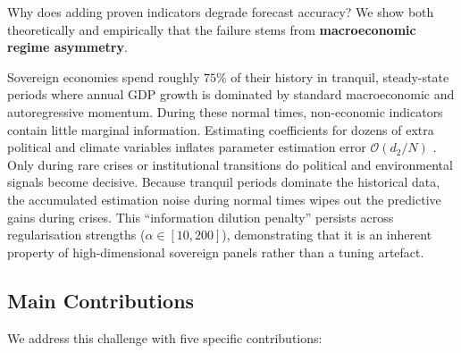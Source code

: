\documentclass[11pt,a4paper]{article}
\begin{document}
Why does adding proven indicators degrade forecast accuracy? We show both theoretically and empirically that the failure stems from \textbf{macroeconomic regime asymmetry}. 

Sovereign economies spend roughly $75\%$ of their history in tranquil, steady-state periods where annual GDP growth is dominated by standard macroeconomic and autoregressive momentum. During these normal times, non-economic indicators contain little marginal information. Estimating coefficients for dozens of extra political and climate variables inflates parameter estimation error $\mathcal{O}(d_2/N)$ \citep{mallows1973}. Only during rare crises or institutional transitions do political and environmental signals become decisive. Because tranquil periods dominate the historical data, the accumulated estimation noise during normal times wipes out the predictive gains during crises. This ``information dilution penalty'' persists across regularisation strengths ($\alpha \in [10, 200]$), demonstrating that it is an inherent property of high-dimensional sovereign panels rather than a tuning artefact.

\subsection{Main Contributions}

We address this challenge with five specific contributions:
\end{document}
